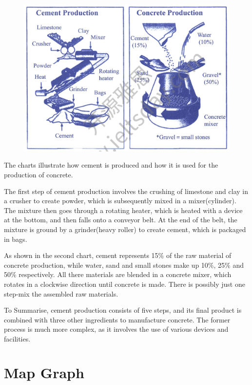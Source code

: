 \documentclass[conference]{IEEEtran}
\begin{document}
\begin{figure}[htbp]
    \centerline{\includegraphics[width=1.0\columnwidth]{images/Screenshot from 2022-12-05 12-18-38.png}}
\end{figure}

The charts illustrate how cement is produced and how it is used for the production of concrete.

The first step of cement production involves the crushing of limestone and clay in a crusher to create powder,
which is subsequently mixed in a mixer(cylinder).
The mixture then goes through a rotating heater, which is heated with a device at the bottom, and then falls onto a conveyor belt.
At the end of the belt, the mixture is ground by a grinder(heavy roller) to create cement, which is packaged in bags.

As shown in the second chart, cement represents 15\% of the raw material of concrete production, 
while water, sand and small stones make up 10\%, 25\% and 50\% respectively.
All there materials are blended in a concrete mixer, which rotates in a clockwise direction until concrete is made.
There is possibly just one step-mix the assembled raw materials.

To Summarise, cement production consists of five steps, and its final product is combined with three other ingredients to manufacture concrete.
The former process is much more complex, as it involves the use of various devices and facilities.

\section{Map Graph}
\end{document}
